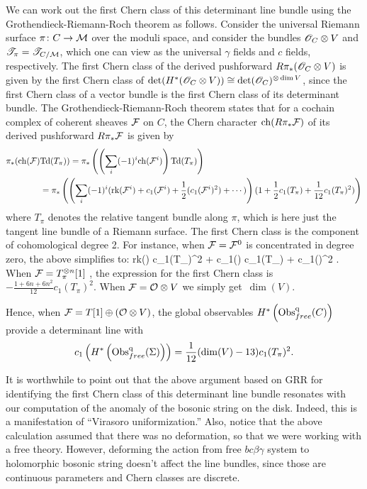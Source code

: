 We can work out the first Chern class of this determinant line bundle using the Grothendieck-Riemann-Roch theorem as follows.
Consider the universal Riemann surface $\pi \colon C \to \mathcal M$ over the moduli space, 
and consider the bundles $\mathscr O_C \otimes V$ and $\mathscr T_\pi = \mathscr T_{C/\mathcal M}$,
which one can view as the universal $\gamma$ fields and $c$ fields, respectively.
The first Chern class of the derived pushforward $R\pi_*(\mathscr O_C \otimes V)$ is given by the first Chern class of $\det(H^*(\mathscr O_C \otimes V)) \cong \det(\mathscr O_C)^{\otimes \dim V}$, 
since the first Chern class of a vector bundle is the first Chern class of its determinant bundle.
The Grothendieck-Riemann-Roch theorem states that for a cochain complex of coherent sheaves $\mathcal F$ on $C$, 
the Chern character ${\rm ch}(R\pi_* \mathcal F)$ of its derived pushforward $R\pi_* \mathcal F$  is given by 
\def\Td{{\rm Td}}
\begin{align*}
\pi_*( \ch(\cF) &\Td(T_\pi)) = \pi_*\left( \left(\sum_{i} (-1)^i \ch (\cF^i) \right) \Td(T_\pi)\right) \\
&= \pi_*\left( \left(\sum_i (-1)^i ({\rm rk}(\cF^i) + c_1(\cF^i) + \frac{1}{2}(c_1(\cF^i)^2) + \cdots)\right) (1 +\frac{1}{2}c_1(T_\pi) + \frac{1}{12} c_1(T_\pi)^2)\right)
\end{align*}
where $T_\pi$ denotes the relative tangent bundle along $\pi$,
which is here just the tangent line bundle of a Riemann surface.
The first Chern class is the component of cohomological degree 2.
For instance, when $\mathcal F = \mathcal F^0$ is concentrated in degree zero, the above simplifies to:
\ben
{} {\rm rk}(\cF) c_1(T_\pi)^2 +  c_1(\cF) c_1(T_\pi) +  c_1(\cF)^2 .
\een  
When $\mathcal F = T^{\otimes n}_{\pi} [1]$ , the expression for the first Chern class is $-\frac{1 + 6n + 6n^2}{12} c_1(T_\pi)^2$.
When $\mathcal F = \mathcal O \otimes V$ we simply get~$\dim(V)$. 

Hence, when $\mathcal F = T[1] \oplus (\mathcal O \otimes V)$, 
the global observables $H^*\left({\rm Obs}^{\rm q}_{free}(C)\right)$ provide a determinant line with
\[
c_1\left(H^*\left({\rm Obs}^{\rm q}_{free}(\Sigma)\right)\right) = \frac{1}{12} (\dim(V) - 13) c_1(T_\pi)^2 .
\]

It is worthwhile to point out that the above argument based on GRR for identifying the first Chern class of this determinant line bundle resonates with our computation of the anomaly of the bosonic string on the disk. Indeed, this is a manifestation of ``Virasoro uniformization.'' 
Also, notice that the above calculation assumed that there was no deformation, so that we were working with a free theory. 
However, deforming the action from free $bc\beta\gamma$ system to holomorphic bosonic string doesn't affect the line bundles, since those are continuous parameters and Chern classes are discrete.

